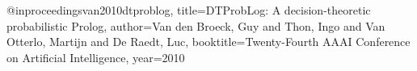 @inproceedings{van2010dtproblog,
  title={DTProbLog: A decision-theoretic probabilistic Prolog},
  author={Van den Broeck, Guy and Thon, Ingo and Van Otterlo, Martijn and De Raedt, Luc},
  booktitle={Twenty-Fourth AAAI Conference on Artificial Intelligence},
  year={2010}
}
